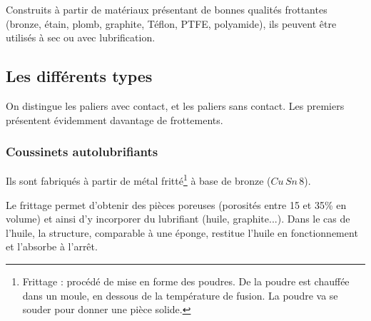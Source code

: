 \documentclass[11pt,oneside]{article}
\begin{document}
Construits à partir de matériaux présentant de bonnes qualités frottantes (bronze, étain, plomb, graphite, Téflon, PTFE, polyamide), ils peuvent être utilisés à sec ou avec lubrification.

\subsection{Les différents types}
On distingue les paliers avec contact, et les paliers sans contact. Les premiers présentent évidemment davantage de frottements.

\subsubsection{Coussinets autolubrifiants}
Ils sont fabriqués à partir de métal fritté\footnote{Frittage : procédé de mise en forme des poudres. De la poudre est chauffée dans un moule, en dessous de la température de fusion. La poudre va se souder pour donner une pièce solide. } à base de bronze (\textbf{$Cu\,Sn\,8$}). 

Le frittage permet d'obtenir des pièces poreuses (porosités entre 15 et 35\% en volume) et ainsi d'y incorporer du lubrifiant (huile, graphite...). Dans le cas de l'huile, la structure, comparable à une éponge, restitue l'huile en fonctionnement et l'absorbe à l'arrêt. 
 		 
\end{document}
